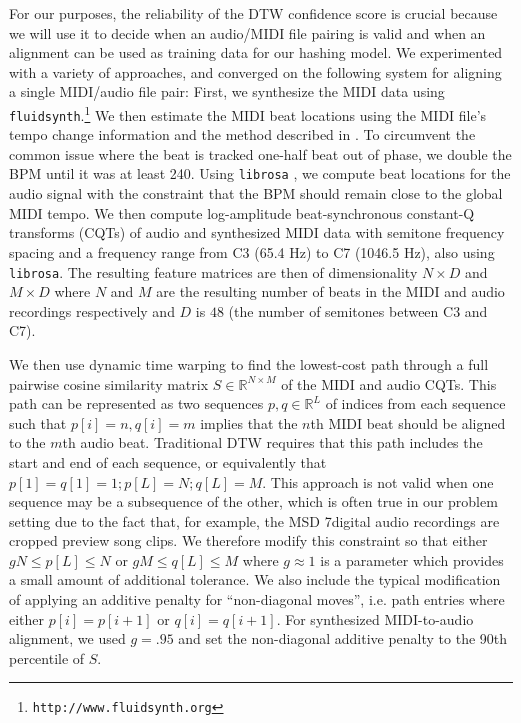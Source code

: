 \documentclass{article}
\begin{document}
For our purposes, the reliability of the DTW confidence score is crucial because we will use it to decide when an audio/MIDI file pairing is valid and when an alignment can be used as training data for our hashing model.
We experimented with a variety of approaches, and converged on the following system for aligning a single MIDI/audio file pair:
First, we synthesize the MIDI data using \texttt{fluidsynth}.\footnote{\texttt{http://www.fluidsynth.org}}
We then estimate the MIDI beat locations using the MIDI file's tempo change information and the method described in \cite{raffel2014pretty_midi}.
To circumvent the common issue where the beat is tracked one-half beat out of phase, we double the BPM until it was at least 240.
Using \texttt{librosa} \cite{mcfee2014librosa}, we compute beat locations for the audio signal with the constraint that the BPM should remain close to the global MIDI tempo. 
We then compute log-amplitude beat-synchronous constant-Q transforms (CQTs) of audio and synthesized MIDI data with semitone frequency spacing and a frequency range from C3 (65.4 Hz) to C7 (1046.5 Hz), also using \texttt{librosa}.
The resulting feature matrices are then of dimensionality $N \times D$ and $M \times D$ where $N$ and $M$ are the resulting number of beats in the MIDI and audio recordings respectively and $D$ is $48$ (the number of semitones between C3 and C7).

We then use dynamic time warping to find the lowest-cost path through a full pairwise cosine similarity matrix $S \in \mathbb{R}^{N \times M}$ of the MIDI and audio CQTs.
This path can be represented as two sequences $p, q \in \mathbb{R}^L$ of indices from each sequence such that $p[i] = n, q[i] = m$ implies that the $n$th MIDI beat should be aligned to the $m$th audio beat.
Traditional DTW requires that this path includes the start and end of each sequence, or equivalently that $p[1] = q[1] = 1; p[L] = N; q[L] = M$.
This approach is not valid when one sequence may be a subsequence of the other, which is often true in our problem setting due to the fact that, for example, the MSD 7digital audio recordings are cropped preview song clips.
We therefore modify this constraint so that either $gN \le p[L] \le N$ or $gM \le q[L] \le M$ where $g \approx 1$ is a parameter which provides a small amount of additional tolerance.
We also include the typical modification of applying an additive penalty for ``non-diagonal moves'', i.e. path entries where either $p[i] = p[i + 1]$ or $q[i] = q[i + 1]$.
For synthesized MIDI-to-audio alignment, we used $g = .95$ and set the non-diagonal additive penalty to the 90th percentile of $S$.
\end{document}
